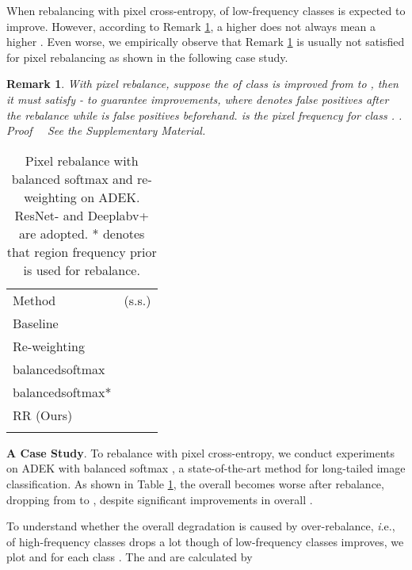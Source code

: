 \documentclass[final]{cvpr}
\newtheorem{theorem}{Remark}
\begin{document}
When rebalancing with pixel cross-entropy,  of low-frequency classes is expected to improve. However, according to Remark \ref{thm:IoU_Acc}, a higher  does not always mean a higher . Even worse, we empirically observe that Remark \ref{thm:IoU_Acc} is usually not satisfied for pixel rebalancing as shown in the following case study.


\begin{theorem}
	\label{thm:IoU_Acc}
	With pixel rebalance, suppose the  of class  is improved from  to , then it must satisfy  -     to guarantee  improvements, where  denotes false positives after the rebalance while  is false positives beforehand.  is the pixel frequency for class . .
	\textit{Proof~~} See the Supplementary Material.
\end{theorem} 

\begin{table}[t]
	\centering
	\setlength{\tabcolsep}{22pt}
	\caption{Pixel rebalance with balanced softmax \cite{DBLP:conf/nips/RenYSMZYL20} and re-weighting on ADEK. ResNet- and Deeplabv+ are adopted. * denotes that region frequency prior is used for rebalance.}
	\label{tab:ade20k_main}
	{
		\begin{tabular}{l|c}
			\shline
			Method &(s.s.) \\ \shline
			Baseline                 & \\ \shline
			Re-weighting             & \\balancedsoftmax          & \\ balancedsoftmax*         & \\ \hline
			RR (Ours)  & \\ \shline
		\end{tabular}
	}
	\label{tab:balancesoftmax_ade20k}
\end{table}

\vspace{1mm}
\noindent\textbf{A Case Study}.
To rebalance with pixel cross-entropy, we conduct experiments on ADEK with balanced softmax \cite{DBLP:conf/nips/RenYSMZYL20}, a state-of-the-art method for long-tailed image classification. As shown in Table \ref{tab:balancesoftmax_ade20k}, the overall  becomes worse after rebalance, dropping from \textbf{} to \textbf{}, despite significant improvements in overall . 

To understand whether the overall  degradation is caused by over-rebalance, {\textit i.e.},  of high-frequency classes drops a lot though  of low-frequency classes improves, we plot  and  for each class . The  and  are calculated by
\end{document}
